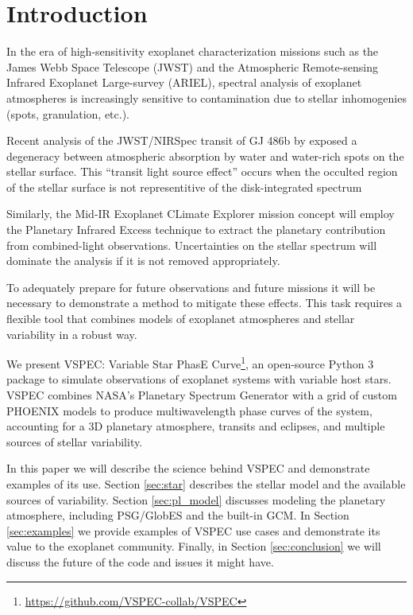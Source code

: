 \documentclass[twocolumn]{aastex631}
\begin{document}

\section{Introduction}
\label{sec:intro}

In the era of high-sensitivity exoplanet characterization missions such as the James Webb Space Telescope (JWST)
and the Atmospheric Remote-sensing Infrared Exoplanet Large-survey (ARIEL), spectral analysis of exoplanet atmospheres
is increasingly sensitive to contamination due to stellar inhomogenies (spots, granulation, etc.).

Recent analysis of the JWST/NIRSpec transit of GJ 486b by \citet{moran2023} exposed a degeneracy between
atmospheric absorption by water and water-rich spots on the stellar surface. This ``transit light source effect''
\citep[TLS,][see also \citet{apai2018,barclay2021,garcia2022,barclay2023}]{rackham2018}
occurs when the occulted region of the stellar surface is not representitive of the disk-integrated spectrum

Similarly, the Mid-IR Exoplanet CLimate Explorer \citep[MIRECLE,][]{mandell2022} mission concept
will employ the Planetary Infrared Excess \citep[PIE][]{stevenson2020} technique to extract the planetary
contribution from combined-light observations. Uncertainties on the stellar spectrum will dominate the analysis if it is not removed appropriately.

To adequately prepare for future observations and future missions it will be necessary to demonstrate a method to mitigate these effects.
This task requires a flexible tool that combines models of exoplanet atmospheres and stellar variability in a robust way.

We present {\sc VSPEC}: Variable Star PhasE Curve\footnote{\url{https://github.com/VSPEC-collab/VSPEC}},
an open-source Python 3 package to simulate observations of exoplanet systems with variable host stars.
{\sc VSPEC} combines NASA's Planetary Spectrum Generator \citep[PSG,][]{villanueva2018} with a grid of
custom PHOENIX models \citep{husser2013} to produce multiwavelength phase curves of the system, accounting
for a 3D planetary atmosphere, transits and eclipses, and multiple sources of stellar variability.

In this paper we will describe the science behind {\sc VSPEC} and demonstrate examples of its use.
Section \ref{sec:star} describes the stellar model and the available sources of variability.
Section \ref{sec:pl_model} discusses modeling the planetary atmosphere, including PSG/GlobES and the
built-in GCM. In Section \ref{sec:examples} we provide examples of {\sc VSPEC} use cases and demonstrate
its value to the exoplanet community. Finally, in Section \ref{sec:conclusion} we will discuss the future of the code and issues it might have.
\end{document}
